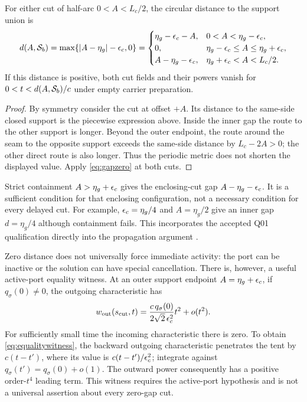\begin{proposition}\label{prop:Q01}
For either cut of half-arc $0<A<L_c/2$, the circular distance to the support union is
\begin{equation}\label{eq:cutdistance}
 d(A,\mathcal S_b)=\max\{|A-\eta_g|-\epsilon_c,0\}
 =\begin{cases}
 \eta_g-\epsilon_c-A,&0<A<\eta_g-\epsilon_c,\\
 0,&\eta_g-\epsilon_c\le A\le\eta_g+\epsilon_c,\\
 A-\eta_g-\epsilon_c,&\eta_g+\epsilon_c<A<L_c/2.
 \end{cases}
\end{equation}
If this distance is positive, both cut fields and their powers vanish for $0<t<d(A,\mathcal S_b)/c$ under empty carrier preparation.
\end{proposition}
\begin{proof}
By symmetry consider the cut at offset $+A$. Its distance to the same-side closed support is the piecewise expression above. Inside the inner gap the route to the other support is longer. Beyond the outer endpoint, the route around the seam to the opposite support exceeds the same-side distance by $L_c-2A>0$; the other direct route is also longer. Thus the periodic metric does not shorten the displayed value. Apply \eqref{eq:gapzero} at both cuts.
\end{proof}

Strict containment $A>\eta_g+\epsilon_c$ gives the enclosing-cut gap $A-\eta_g-\epsilon_c$. It is a sufficient condition for that enclosing configuration, not a necessary condition for every delayed cut. For example, $\epsilon_c=\eta_g/4$ and $A=\eta_g/2$ give an inner gap $d=\eta_g/4$ although containment fails. This incorporates the accepted Q01 qualification directly into the propagation argument \cite{CR}.

Zero distance does not universally force immediate activity: the port can be inactive or the solution can have special cancellation. There is, however, a useful active-port equality witness. At an outer support endpoint $A=\eta_g+\epsilon_c$, if $q_\sigma(0)\ne0$, the outgoing characteristic has
\begin{equation}\label{eq:equalitywitness}
 w_{\rm out}(s_{\rm cut},t)
 =\frac{c\,q_\sigma(0)}{2\sqrt2\,\epsilon_c^2}t^2+o(t^2).
\end{equation}
For sufficiently small time the incoming characteristic there is zero. To obtain \eqref{eq:equalitywitness}, the backward outgoing characteristic penetrates the tent by $c(t-t')$, where its value is $c(t-t')/\epsilon_c^2$; integrate against $q_\sigma(t')=q_\sigma(0)+o(1)$. The outward power consequently has a positive order-$t^4$ leading term. This witness requires the active-port hypothesis and is not a universal assertion about every zero-gap cut.

